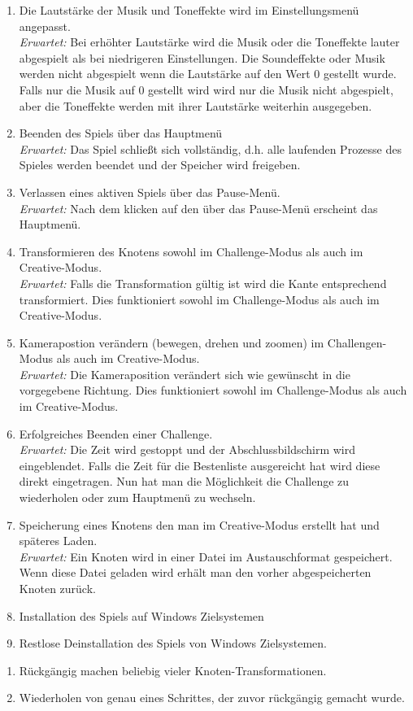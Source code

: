 \begin{enumerate}
\item Die Lautstärke der Musik und Toneffekte wird im Einstellungsmenü angepasst. \\  
\textit{Erwartet:} Bei erhöhter Lautstärke wird die Musik oder die Toneffekte lauter abgespielt als bei niedrigeren Einstellungen. Die Soundeffekte oder Musik werden nicht abgespielt wenn die Lautstärke auf den Wert 0 gestellt wurde. Falls nur die Musik auf 0 gestellt wird wird nur die Musik nicht abgespielt, aber die Toneffekte werden mit ihrer Lautstärke weiterhin ausgegeben.
\item Beenden des Spiels über das Hauptmenü\\
\textit{Erwartet:} Das Spiel schließt sich vollständig, d.h. alle laufenden Prozesse des Spieles werden beendet und der Speicher wird freigeben.
\item Verlassen eines aktiven Spiels über das Pause-Menü.\\
\textit{Erwartet:} Nach dem klicken auf den  über das Pause-Menü erscheint das Hauptmenü.
\item Transformieren des Knotens sowohl im Challenge-Modus als auch im Creative-Modus.\\
\textit{Erwartet:} Falls die Transformation gültig ist wird die Kante entsprechend transformiert. Dies funktioniert sowohl im Challenge-Modus als auch im Creative-Modus.
\item Kamerapostion verändern (bewegen, drehen und zoomen) im Challengen-Modus als auch im Creative-Modus.\\
\textit{Erwartet:} Die Kameraposition verändert sich wie gewünscht in die vorgegebene Richtung. Dies funktioniert sowohl im Challenge-Modus als auch im Creative-Modus.
\item Erfolgreiches Beenden einer Challenge. \\
\textit{Erwartet:} Die Zeit wird gestoppt und der Abschlussbildschirm wird eingeblendet. Falls die Zeit für die Bestenliste ausgereicht hat wird diese direkt eingetragen. Nun hat man die Möglichkeit die Challenge zu wiederholen oder zum Hauptmenü zu wechseln.
\item Speicherung eines Knotens den man im Creative-Modus erstellt hat und späteres Laden.\\
\textit{Erwartet:} Ein Knoten wird in einer Datei im Austauschformat gespeichert. Wenn diese Datei geladen wird erhält man den vorher abgespeicherten Knoten zurück.
\item Installation des Spiels auf Windows Zielsystemen
\item Restlose Deinstallation des Spiels von Windows Zielsystemen.

\end{enumerate}

\begin{enumerate}[resume]
\item Rückgängig machen beliebig vieler Knoten-Transformationen. 
\item Wiederholen von genau eines Schrittes, der zuvor rückgängig gemacht wurde. 
\end{enumerate}
